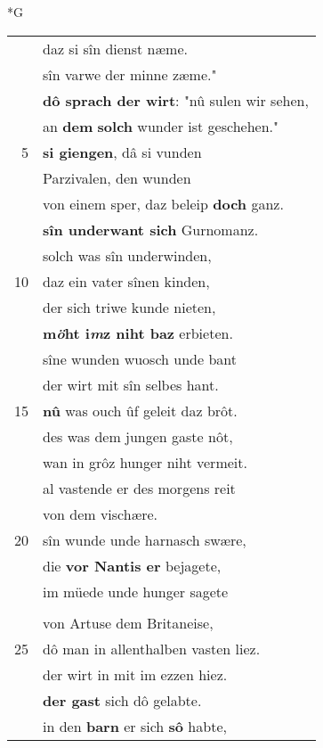 \documentclass[8pt,a4paper,notitlepage]{article}
\begin{document}
\newpage
\begin{table}[ht]
\begin{minipage}[t]{0.5\linewidth}
\small
\begin{center}*G
\end{center}
\begin{tabular}{rl}
 & daz si sîn dienst næme.\\ 
 & sîn varwe der minne zæme."\\ 
 & \textbf{dô sprach der wirt}: "nû sulen wir sehen,\\ 
 & an \textbf{dem} \textbf{solch} wunder ist geschehen."\\ 
5 & \textbf{si giengen}, dâ si vunden\\ 
 & Parzivalen, den wunden\\ 
 & von einem sper, daz beleip \textbf{doch} ganz.\\ 
 & \textbf{sîn underwant sich} Gurnomanz.\\ 
 & solch was sîn underwinden,\\ 
10 & daz ein vater sînen kinden,\\ 
 & der sich triwe kunde nieten,\\ 
 & \textbf{m\textit{ö}ht i\textit{m}z niht baz} erbieten.\\ 
 & sîne wunden wuosch unde bant\\ 
 & der wirt mit sîn selbes hant.\\ 
15 & \textbf{nû} was ouch ûf geleit daz brôt.\\ 
 & des was dem jungen gaste nôt,\\ 
 & wan in grôz hunger niht vermeit.\\ 
 & al vastende er des morgens reit\\ 
 & von dem vischære.\\ 
20 & sîn wunde unde harnasch swære,\\ 
 & die \textbf{vor Nantis er} bejagete,\\ 
 & im müede unde hunger sagete\\ 
 & \textbf{\begin{large}U\end{large}nt} diu verre tagereise\\ 
 & von Artuse dem Britaneise,\\ 
25 & dô man in allenthalben vasten liez.\\ 
 & der wirt in mit im ezzen hiez.\\ 
 & \textbf{der gast} sich dô gelabte.\\ 
 & in den \textbf{barn} er sich \textbf{sô} habte,\\ 

\end{tabular}
\end{minipage}
\end{table}
\end{document}
